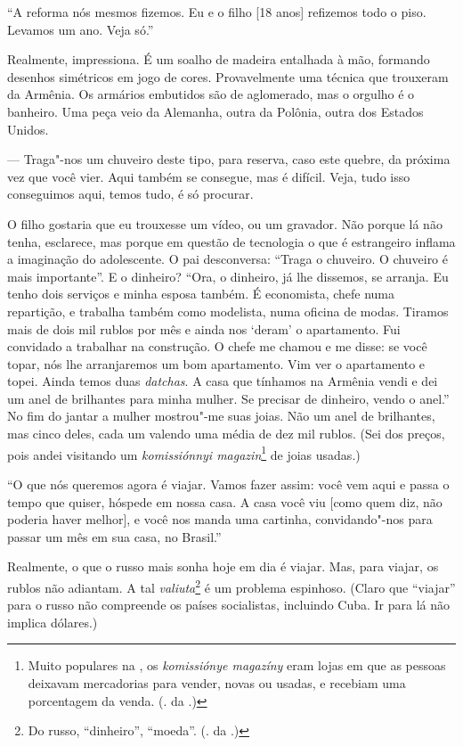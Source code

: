 ``A reforma nós mesmos fizemos. Eu e o filho [18 anos] refizemos todo o piso. Levamos um ano. Veja só.''

Realmente, impressiona. É um soalho de madeira entalhada à mão, formando desenhos simétricos em jogo de cores. Provavelmente uma
técnica que trouxeram da Armênia. Os armários embutidos são de aglomerado, mas o orgulho é o banheiro. Uma peça veio da Alemanha, outra da Polônia, outra dos Estados Unidos.

--- Traga"-nos um chuveiro deste tipo, para reserva, caso este quebre, da próxima vez que você vier. Aqui também se consegue, mas é difícil. Veja, tudo isso conseguimos aqui, temos tudo, é só procurar.

O filho gostaria que eu trouxesse um vídeo, ou um gravador. Não porque lá não tenha, esclarece, mas porque em questão de tecnologia o que é estrangeiro inflama a imaginação do adolescente. O pai desconversa: ``Traga o chuveiro. O chuveiro é mais importante''. E o dinheiro? ``Ora, o dinheiro, já lhe dissemos, se arranja. Eu tenho dois serviços e minha esposa também. É economista, chefe numa repartição, e trabalha também como modelista, numa oficina de modas. Tiramos mais de dois mil rublos por mês e ainda nos `deram' o apartamento. Fui convidado a trabalhar na construção. O chefe me chamou e me disse: se você topar, nós lhe arranjaremos um bom apartamento. Vim ver o apartamento e topei. Ainda temos duas \emph{datchas}. A casa que tínhamos na Armênia vendi e dei um anel de brilhantes para minha mulher. Se precisar de dinheiro, vendo o anel.'' No fim do jantar a mulher mostrou"-me suas joias. Não um anel de brilhantes, mas cinco deles, cada um valendo uma média de dez mil rublos. (Sei dos preços, pois andei visitando um \emph{komissiónnyi magazin}\footnote{Muito populares na , os \emph{komissiónye magazíny} eram lojas em que as pessoas deixavam mercadorias para vender, novas ou usadas, e recebiam uma porcentagem da venda. (. da .)} de joias usadas.)

``O que nós queremos agora é viajar. Vamos fazer assim: você vem aqui e passa o tempo que quiser, hóspede em nossa casa. A casa você viu [como quem diz, não poderia haver melhor], e você nos manda uma cartinha, convidando"-nos para passar um mês em sua casa, no Brasil.''

Realmente, o que o russo mais sonha hoje em dia é viajar. Mas, para viajar, os rublos não adiantam. A tal \emph{valiuta}\footnote{Do russo, ``dinheiro'', ``moeda''. (. da .)} é um problema espinhoso. (Claro que ``viajar'' para o russo não compreende os países socialistas, incluindo Cuba. Ir para lá não implica dólares.)

